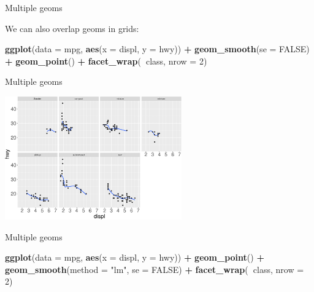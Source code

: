\documentclass[ignorenonframetext,]{beamer}
\newenvironment{Shaded}{\begin{snugshade}}{\end{snugshade}}
\newcommand{\DataTypeTok}[1]{\textcolor[rgb]{0.13,0.29,0.53}{#1}}
\newcommand{\DecValTok}[1]{\textcolor[rgb]{0.00,0.00,0.81}{#1}}
\newcommand{\KeywordTok}[1]{\textcolor[rgb]{0.13,0.29,0.53}{\textbf{#1}}}
\newcommand{\NormalTok}[1]{#1}
\newcommand{\OperatorTok}[1]{\textcolor[rgb]{0.81,0.36,0.00}{\textbf{#1}}}
\newcommand{\OtherTok}[1]{\textcolor[rgb]{0.56,0.35,0.01}{#1}}
\newcommand{\StringTok}[1]{\textcolor[rgb]{0.31,0.60,0.02}{#1}}
\begin{document}
\begin{frame}[fragile]{Multiple geoms}
\protect\hypertarget{multiple-geoms-22}{}

We can also overlap geoms in grids:

\begin{Shaded}
\begin{Highlighting}[]
\KeywordTok{ggplot}\NormalTok{(}\DataTypeTok{data =}\NormalTok{ mpg, }\KeywordTok{aes}\NormalTok{(}\DataTypeTok{x =}\NormalTok{ displ, }\DataTypeTok{y =}\NormalTok{ hwy)) }\OperatorTok{+}\StringTok{ }
\StringTok{  }\KeywordTok{geom_smooth}\NormalTok{(}\DataTypeTok{se =} \OtherTok{FALSE}\NormalTok{) }\OperatorTok{+}\StringTok{ }
\StringTok{  }\KeywordTok{geom_point}\NormalTok{() }\OperatorTok{+}\StringTok{ }
\StringTok{  }\KeywordTok{facet_wrap}\NormalTok{(}\OperatorTok{~}\NormalTok{class, }\DataTypeTok{nrow =} \DecValTok{2}\NormalTok{)}
\end{Highlighting}
\end{Shaded}

\end{frame}

\begin{frame}{Multiple geoms}
\protect\hypertarget{multiple-geoms-23}{}

\begin{center}\includegraphics[height=200px]{data-visualization_files/figure-beamer/unnamed-chunk-101-1} \end{center}

\end{frame}

\begin{frame}[fragile]{Multiple geoms}
\protect\hypertarget{multiple-geoms-24}{}

\begin{Shaded}
\begin{Highlighting}[]
\KeywordTok{ggplot}\NormalTok{(}\DataTypeTok{data =}\NormalTok{ mpg, }\KeywordTok{aes}\NormalTok{(}\DataTypeTok{x =}\NormalTok{ displ, }\DataTypeTok{y =}\NormalTok{ hwy)) }\OperatorTok{+}\StringTok{ }
\StringTok{  }\KeywordTok{geom_point}\NormalTok{() }\OperatorTok{+}\StringTok{ }
\StringTok{  }\KeywordTok{geom_smooth}\NormalTok{(}\DataTypeTok{method =} \StringTok{"lm"}\NormalTok{, }\DataTypeTok{se =} \OtherTok{FALSE}\NormalTok{) }\OperatorTok{+}\StringTok{ }
\StringTok{  }\KeywordTok{facet_wrap}\NormalTok{(}\OperatorTok{~}\NormalTok{class, }\DataTypeTok{nrow =} \DecValTok{2}\NormalTok{)}
\end{Highlighting}
\end{Shaded}

\end{frame}
\end{document}
